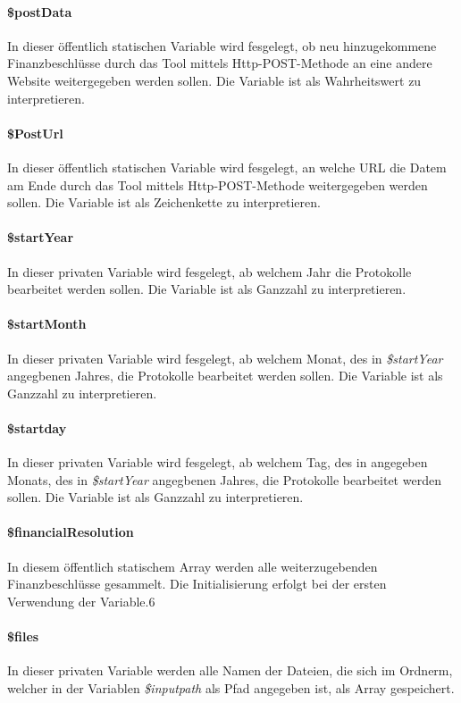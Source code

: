 \documentclass[12pt,parskip=full, pagea4]{scrartcl}
\begin{document}
	\paragraph{\$postData} In dieser öffentlich statischen Variable wird fesgelegt, ob neu hinzugekommene Finanzbeschlüsse durch das Tool mittels Http-POST-Methode an eine andere Website weitergegeben werden sollen. Die Variable ist als Wahrheitswert zu interpretieren.
	
	\paragraph{\$PostUrl} In dieser öffentlich statischen Variable wird fesgelegt, an welche URL die Datem am Ende durch das Tool mittels Http-POST-Methode weitergegeben werden sollen. Die Variable ist als Zeichenkette zu interpretieren.
	
	\paragraph{\$startYear} In dieser privaten Variable wird fesgelegt, ab welchem Jahr die Protokolle bearbeitet werden sollen. Die Variable ist als Ganzzahl zu interpretieren.
	
	\paragraph{\$startMonth} In dieser privaten Variable wird fesgelegt, ab welchem Monat, des in \textit{\$startYear} angegbenen Jahres, die Protokolle bearbeitet werden sollen. Die Variable ist als Ganzzahl zu interpretieren.
	
	\paragraph{\$startday} In dieser privaten Variable wird fesgelegt, ab welchem Tag, des in  angegeben Monats, des in \textit{\$startYear} angegbenen Jahres, die Protokolle bearbeitet werden sollen. Die Variable ist als Ganzzahl zu interpretieren.
	
	\paragraph{\$financialResolution} In diesem öffentlich statischem Array werden alle weiterzugebenden Finanzbeschlüsse gesammelt. Die Initialisierung erfolgt bei der ersten Verwendung der Variable.6
	
	\paragraph{\$files} In dieser privaten Variable werden alle Namen der Dateien, die sich im Ordnerm, welcher in der Variablen \textit{\$inputpath} als Pfad angegeben ist, als Array gespeichert.
	
\end{document}
